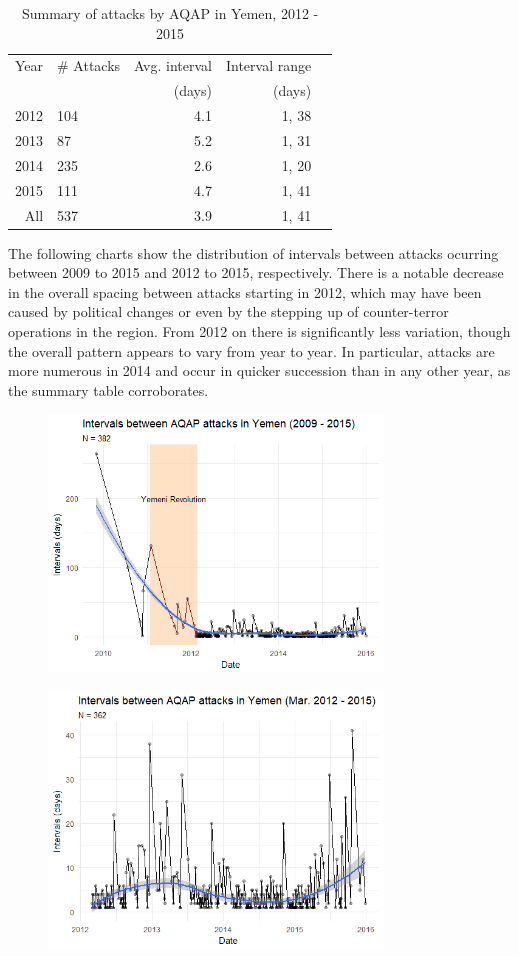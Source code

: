 \documentclass[letterpaper,12pt]{article}
\theoremstyle{definition}
\begin{document}
\begin {table}[H]
\begin{center}
\caption {Summary of attacks by AQAP in Yemen, 2012 - 2015}
\begin{tabular}{rlrrl}
  \hline
Year & \# Attacks & Avg. interval & Interval range \\ 
&&(days)&(days)\\
  \hline
2012 & 104 & 4.1 & 1, 38 \\ 
  2013 &  87 & 5.2 & 1, 31 \\ 
  2014 & 235 & 2.6 & 1, 20 \\ 
  2015 & 111 & 4.7 & 1, 41 \\ 
  \hline
  All & 537 & 3.9 & 1, 41 \\ 
   \hline
\end{tabular}
\end{center}
\end {table}

The following charts show the distribution of intervals between attacks ocurring between 2009 to 2015 and 2012 to 2015, respectively. There is a notable decrease in the overall spacing between attacks starting in 2012, which may have been caused by political changes or even by the stepping up of counter-terror operations in the region. From 2012 on there is significantly less variation, though the overall pattern appears to vary from year to year. In particular, attacks are more numerous in 2014 and occur in quicker succession than in any other year, as the summary table corroborates.

\begin{figure}[htb!]
  \includegraphics[width=3.5in]{intervals2009.png}
\end{figure}
\begin{figure}[htb!]
  \includegraphics[width=3.5in]{intervals2012.png}
\end{figure}
\end{document}
